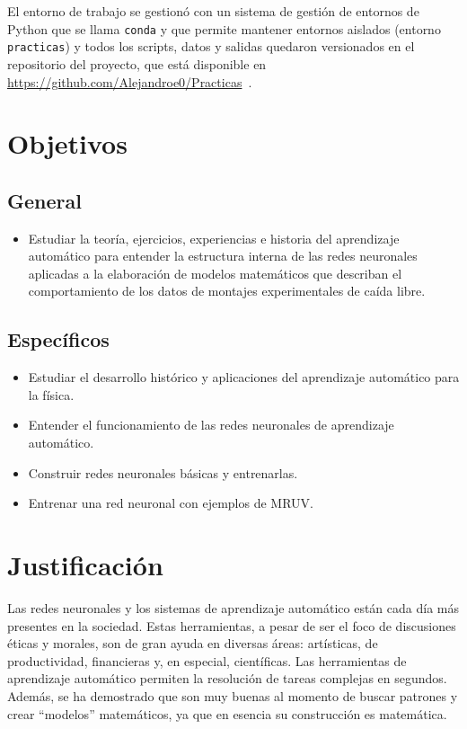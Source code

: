 \documentclass[titlepage,11pt]{article}
\begin{document}
El entorno de trabajo se gestionó con un sistema de gestión de entornos de Python que se llama
\texttt{conda} y que permite mantener entornos aislados (entorno
\texttt{practicas}) y todos los scripts, datos y salidas quedaron versionados
en el repositorio del proyecto, que está disponible en
\url{https://github.com/Alejandroe0/Practicas}~\cite{repositorio}.


\section{Objetivos}
\label{sec:objetivos}

\subsection{General}
\label{sec:general}
\begin{itemize}
\item Estudiar la teoría, ejercicios, experiencias e historia del aprendizaje
  automático para entender la estructura interna de las redes neuronales
  aplicadas a la elaboración de modelos matemáticos que describan el
  comportamiento de los datos de montajes experimentales de caída libre.
\end{itemize}

\subsection{Específicos}
\label{sec:especificos}
\begin{itemize}
\item Estudiar el desarrollo histórico y aplicaciones del aprendizaje
  automático para la física.
\item Entender el funcionamiento de las redes neuronales de aprendizaje
  automático.
\item Construir redes neuronales básicas y entrenarlas.
\item Entrenar una red neuronal con ejemplos de MRUV.
\end{itemize}


\section{Justificación}
\label{sec:justificacion}
Las redes neuronales y los sistemas de aprendizaje automático están cada día
más presentes en la sociedad. Estas herramientas, a pesar de ser el foco de
discusiones éticas y morales, son de gran ayuda en diversas áreas: artísticas,
de productividad, financieras y, en especial, científicas. Las herramientas de
aprendizaje automático permiten la resolución de tareas complejas en segundos.
Además, se ha demostrado que son muy buenas al momento de buscar patrones y
crear \enquote{modelos} matemáticos, ya que en esencia su construcción es
matemática.
\end{document}
